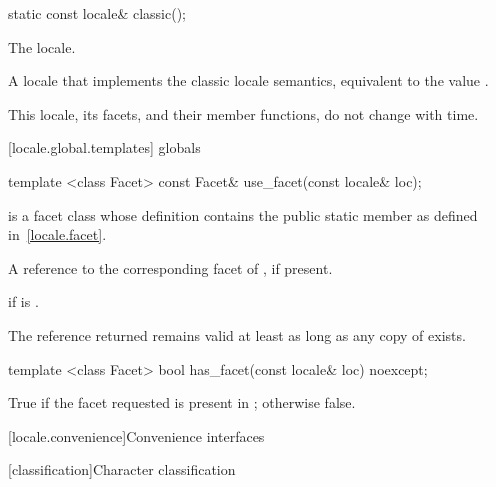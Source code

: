 %
%
\begin{itemdecl}
static const locale& classic();
\end{itemdecl}

\begin{itemdescr}
\pnum
The  locale.

\pnum
\returns
A locale that implements the classic  locale semantics, equivalent
to the value .

\pnum
\notes
This locale, its facets, and their member functions, do not change
with time.
\end{itemdescr}

[locale.global.templates]{ globals}

%
%
\begin{itemdecl}
template <class Facet> const Facet& use_facet(const locale& loc);
\end{itemdecl}

\begin{itemdescr}
\pnum
\requires
{}
is a facet class whose definition contains the public static member
as defined in~\ref{locale.facet}.

\pnum
\returns
A reference to the corresponding facet of , if present.

\pnum
\throws
{}
if
is
.

\pnum
\notes
The reference returned remains valid at least as long as any copy of
 exists.
\end{itemdescr}

%
%
\begin{itemdecl}
template <class Facet> bool has_facet(const locale& loc) noexcept;
\end{itemdecl}

\begin{itemdescr}
\pnum
\returns
True if the facet requested is present in ; otherwise false.
\end{itemdescr}

[locale.convenience]{Convenience interfaces}

[classification]{Character classification}

